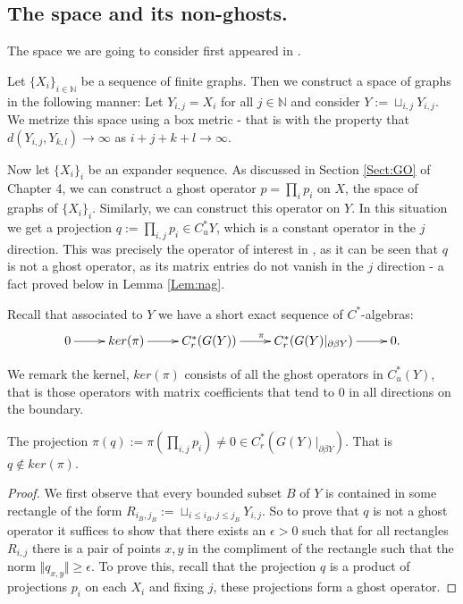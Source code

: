 \begin{example}
\subsection{The space and its non-ghosts.}

The space we are going to consider first appeared in \cite{MR2363697}.

Let $\lbrace X_{i} \rbrace_{i \in \mathbb{N}}$ be a sequence of finite graphs. Then we construct a space of graphs in the following manner: Let $Y_{i,j} = X_{i}$ for all $j \in \mathbb{N}$ and consider $Y:= \sqcup_{i,j} Y_{i,j}$. We metrize this space using a box metric - that is with the property that $d(Y_{i,j},Y_{k,l}) \rightarrow \infty$ as $i+j+k+l \rightarrow \infty$. 

Now let $\lbrace X_{i} \rbrace_{i}$ be an expander sequence. As discussed in Section \ref{Sect:GO} of Chapter 4, we can construct a ghost operator $p= \prod_{i} p_{i}$ on $X$, the space of graphs of $\lbrace X_{i} \rbrace_{i}$. Similarly, we can construct this operator on $Y$. In this situation we get a projection $q:=\prod_{i,j}p_{i} \in C^{*}_{u}Y$, which is a constant operator in the $j$ direction. This was precisely the operator of interest in \cite{MR2363697}, as it can be seen that $q$ is not a ghost operator, as its matrix entries do not vanish in the $j$ direction - a fact proved below in Lemma \ref{Lem:nag}.

Recall that associated to $Y$ we have a short exact sequence of $C^{*}$-algebras:
\begin{equation*}
\xymatrix{
0 \ar[r] & ker(\pi) \ar[r]& C_{r}^{*}(G(Y)) \ar[r]^{\pi} & C_{r}^{*}(G(Y)|_{\partial\beta Y}) \ar[r] & 0.
}
\end{equation*}

We remark the kernel, $ker(\pi)$ consists of all the ghost operators in $C^{*}_{u}(Y)$, that is those operators with matrix coefficients that tend to $0$ in all directions on the boundary. 

\begin{lemma}\label{Lem:nag}
The projection $\pi(q):= \pi(\prod_{i,j}p_{i}) \not = 0 \in C^{*}_{r}(G(Y)|_{\partial\beta Y})$. That is $q \not\in ker(\pi)$.
\end{lemma}
\begin{proof}
We first observe that every bounded subset $B$ of $Y$ is contained in some rectangle of the form $R_{i_{B},j_{B}}:=\sqcup_{i\leq i_{B},j\leq j_{B}}Y_{i,j}$. So to prove that $q$ is not a ghost operator it suffices to show that there exists an $\epsilon>0$ such that for all rectangles $R_{i,j}$ there is a pair of points $x,y$ in the compliment of the rectangle such that  the norm $\Vert q_{x,y} \Vert \geq \epsilon$. To prove this, recall that the projection $q$ is a product of projections $p_{i}$ on each $X_{i}$ and fixing $j$, these projections form a ghost operator. 


\end{proof}
\end{example}
